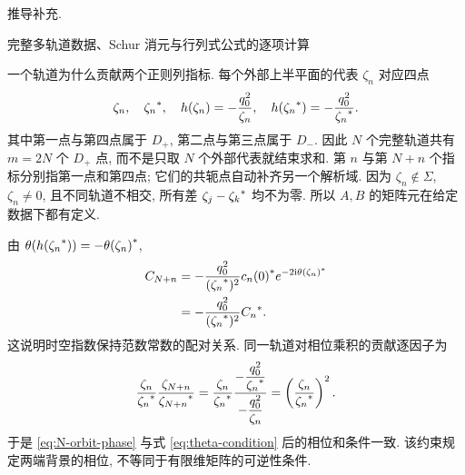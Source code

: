 \par\medskip\noindent 推导补充.\par
\par\medskip\noindent 完整多轨道数据、Schur 消元与行列式公式的逐项计算\par
\par\smallskip\noindent 一个轨道为什么贡献两个正则列指标.\quad
每个外部上半平面的代表 $\zeta_n$ 对应四点
\begin{equation*}
\zeta_n,\quad {\zeta_n}^{*},\quad
h(\zeta_n)=-\dfrac{q_0^2}{\zeta_n},\quad
h({\zeta_n}^{*})=-\dfrac{q_0^2}{{\zeta_n}^{*}}.
\end{equation*}
其中第一点与第四点属于 $D_+$, 第二点与第三点属于 $D_-$.
因此 $N$ 个完整轨道共有 $m=2N$ 个 $D_+$ 点,
而不是只取 $N$ 个外部代表就结束求和.
第 $n$ 与第 $N+n$ 个指标分别指第一点和第四点;
它们的共轭点自动补齐另一个解析域.
因为 $\zeta_n\notin\Sigma$, $\zeta_n\ne0$,
且不同轨道不相交, 所有差 $\zeta_j-{\zeta_k}^{*}$ 均不为零.
所以 $A,B$ 的矩阵元在给定数据下都有定义.

由 $\theta(h({\zeta_n}^{*}))=-{\theta(\zeta_n)}^{*}$,
\begin{equation*}
\begin{aligned}
C_{N+n}
&=-\dfrac{q_0^2}{({\zeta_n}^{*})^2}{c_n(0)}^{*}
e^{-2\mathrm{i}{\theta(\zeta_n)}^{*}}\\
&=-\dfrac{q_0^2}{({\zeta_n}^{*})^2}{C_n}^{*}.
\end{aligned}
\end{equation*}
这说明时空指数保持范数常数的配对关系.
同一轨道对相位乘积的贡献逐因子为
\begin{equation*}
\dfrac{\zeta_n}{{\zeta_n}^{*}}
\dfrac{\zeta_{N+n}}{{\zeta_{N+n}}^{*}}
=\dfrac{\zeta_n}{{\zeta_n}^{*}}
\dfrac{-\dfrac{q_0^2}{{\zeta_n}^{*}}}{-\dfrac{q_0^2}{\zeta_n}}
=\left(\dfrac{\zeta_n}{{\zeta_n}^{*}}\right)^2.
\end{equation*}
于是 \eqref{eq:N-orbit-phase} 与式 \eqref{eq:theta-condition} 后的相位和条件一致.
该约束规定两端背景的相位, 不等同于有限维矩阵的可逆性条件.

